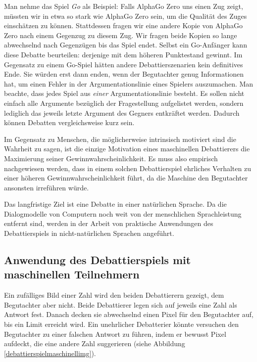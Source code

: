 Man nehme das Spiel \emph{Go} als Beispiel: Falls AlphaGo Zero uns einen Zug zeigt, müssten wir in etwa so stark wie AlphaGo Zero sein, um die Qualität des Zuges einschätzen zu können. Stattdessen fragen wir eine andere Kopie von AlphaGo Zero nach einem Gegenzug zu diesem Zug. Wir fragen beide Kopien so lange abwechselnd nach Gegenzügen bis das Spiel endet. Selbst ein Go-Anfänger kann diese Debatte beurteilen: derjenige mit dem höheren Punktestand gewinnt. Im Gegensatz zu einem Go-Spiel hätten andere Debattierszenarien kein definitives Ende. Sie würden erst dann enden, wenn der Begutachter genug Informationen hat, um einen Fehler in der Argumentationslinie eines Spielers auszumachen. Man beachte, dass jedes Spiel aus \emph{einer} Argumentationslinie besteht. Es sollen nicht einfach alle Argumente bezüglich der Fragestellung aufgelistet werden, sondern lediglich das jeweils letzte Argument des Gegners entkräftet werden. Dadurch können Debatten vergleichsweise kurz sein.

Im Gegensatz zu Menschen, die möglicherweise intrinsisch motiviert sind die Wahrheit zu sagen, ist die einzige Motivation eines maschinellen Debattierers die Maximierung seiner Gewinnwahrscheinlichkeit. Es muss also empirisch nachgewiesen werden, dass in einem solchen Debattierspiel ehrliches Verhalten zu einer höheren Gewinnwahrscheinlichkeit führt, da die Maschine den Begutachter ansonsten irreführen würde. 

Das langfristige Ziel ist eine Debatte in einer natürlichen Sprache. Da die Dialogmodelle von Computern noch weit von der menschlichen Sprachleistung entfernt sind, werden in der Arbeit von \citeauthor{irving_ai_2018} praktische Anwendungen des Debattierspiels in nicht-natürlichen Sprachen angeführt.

\subsection{Anwendung des Debattierspiels mit maschinellen Teilnehmern}
Ein zufälliges Bild einer Zahl wird den beiden Debattierern gezeigt, dem Begutachter aber nicht. Beide Debattierer legen sich auf jeweils eine Zahl als Antwort fest. Danach decken sie abwechselnd einen Pixel für den Begutachter auf, bis ein Limit erreicht wird. Ein unehrlicher Debatterier könnte versuchen den Begutachter zu einer falschen Antwort zu führen, indem er bewusst Pixel aufdeckt, die eine andere Zahl suggerieren (siehe Abbildung \ref{debattierspielmaschinellimg}).

